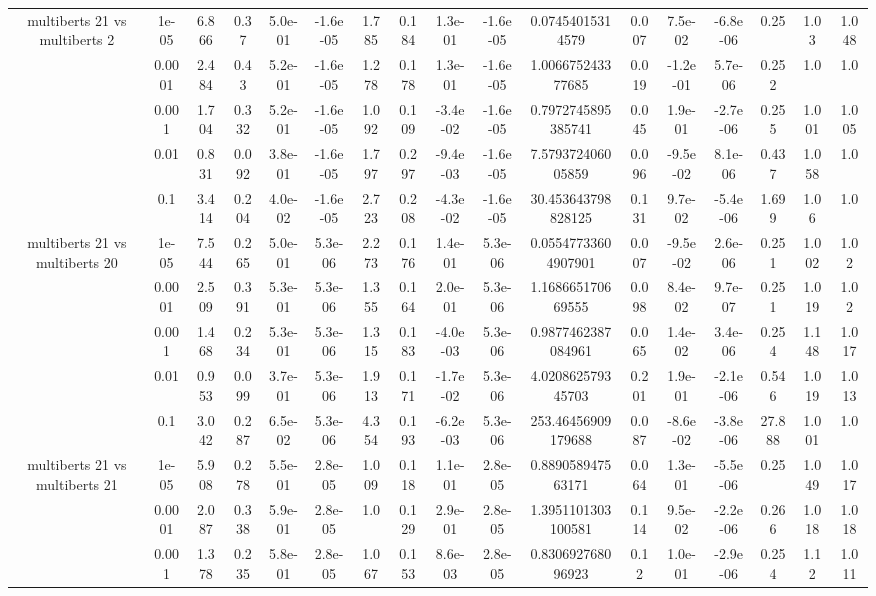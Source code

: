 \begin{tabular}{|c|c|c|c|c|c|c|c|c|c|c|c|c|c|c|c|c|}
\hline
\multirow{5}{*}{multiberts 21 vs multiberts 2} & 1e-05 & 6.866 & 0.37 & 5.0e-01 & -1.6e-05 & 1.785 & 0.184 & 1.3e-01 & -1.6e-05 & 0.07454015314579 & 0.007 & 7.5e-02 & -6.8e-06 & 0.25 & 1.03 & 1.048 \\
 & 0.0001 & 2.484 & 0.43 & 5.2e-01 & -1.6e-05 & 1.278 & 0.178 & 1.3e-01 & -1.6e-05 & 1.006675243377685 & 0.019 & -1.2e-01 & 5.7e-06 & 0.252 & 1.0 & 1.0 \\
 & 0.001 & 1.704 & 0.332 & 5.2e-01 & -1.6e-05 & 1.092 & 0.109 & -3.4e-02 & -1.6e-05 & 0.7972745895385741 & 0.045 & 1.9e-01 & -2.7e-06 & 0.255 & 1.001 & 1.005 \\
 & 0.01 & 0.831 & 0.092 & 3.8e-01 & -1.6e-05 & 1.797 & 0.297 & -9.4e-03 & -1.6e-05 & 7.579372406005859 & 0.096 & -9.5e-02 & 8.1e-06 & 0.437 & 1.058 & 1.0 \\
 & 0.1 & 3.414 & 0.204 & 4.0e-02 & -1.6e-05 & 2.723 & 0.208 & -4.3e-02 & -1.6e-05 & 30.453643798828125 & 0.131 & 9.7e-02 & -5.4e-06 & 1.699 & 1.06 & 1.0 \\
\hline
\multirow{5}{*}{multiberts 21 vs multiberts 20} & 1e-05 & 7.544 & 0.265 & 5.0e-01 & 5.3e-06 & 2.273 & 0.176 & 1.4e-01 & 5.3e-06 & 0.05547733604907901 & 0.007 & -9.5e-02 & 2.6e-06 & 0.251 & 1.002 & 1.02 \\
 & 0.0001 & 2.509 & 0.391 & 5.3e-01 & 5.3e-06 & 1.355 & 0.164 & 2.0e-01 & 5.3e-06 & 1.168665170669555 & 0.098 & 8.4e-02 & 9.7e-07 & 0.251 & 1.019 & 1.02 \\
 & 0.001 & 1.468 & 0.234 & 5.3e-01 & 5.3e-06 & 1.315 & 0.183 & -4.0e-03 & 5.3e-06 & 0.9877462387084961 & 0.065 & 1.4e-02 & 3.4e-06 & 0.254 & 1.148 & 1.017 \\
 & 0.01 & 0.953 & 0.099 & 3.7e-01 & 5.3e-06 & 1.913 & 0.171 & -1.7e-02 & 5.3e-06 & 4.020862579345703 & 0.201 & 1.9e-01 & -2.1e-06 & 0.546 & 1.019 & 1.013 \\
 & 0.1 & 3.042 & 0.287 & 6.5e-02 & 5.3e-06 & 4.354 & 0.193 & -6.2e-03 & 5.3e-06 & 253.46456909179688 & 0.087 & -8.6e-02 & -3.8e-06 & 27.888 & 1.001 & 1.0 \\
\hline
\multirow{5}{*}{multiberts 21 vs multiberts 21} & 1e-05 & 5.908 & 0.278 & 5.5e-01 & 2.8e-05 & 1.009 & 0.118 & 1.1e-01 & 2.8e-05 & 0.889058947563171 & 0.064 & 1.3e-01 & -5.5e-06 & 0.25 & 1.049 & 1.017 \\
 & 0.0001 & 2.087 & 0.338 & 5.9e-01 & 2.8e-05 & 1.0 & 0.129 & 2.9e-01 & 2.8e-05 & 1.3951101303100581 & 0.114 & 9.5e-02 & -2.2e-06 & 0.266 & 1.018 & 1.018 \\
 & 0.001 & 1.378 & 0.235 & 5.8e-01 & 2.8e-05 & 1.067 & 0.153 & 8.6e-03 & 2.8e-05 & 0.830692768096923 & 0.12 & 1.0e-01 & -2.9e-06 & 0.254 & 1.12 & 1.011 \\

\end{tabular}
